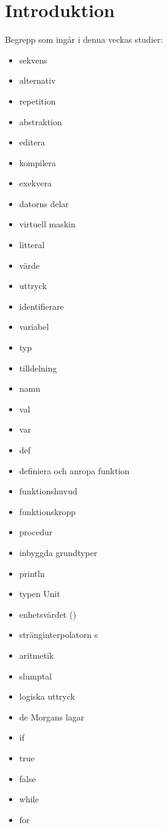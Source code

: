 \chapter{Introduktion}\label{chapter:W01}
Begrepp som ingår i denna veckas studier:
\begin{multicols}{2}\begin{itemize}[noitemsep,label={$\square$},leftmargin=*]
\item sekvens
\item alternativ
\item repetition
\item abstraktion
\item editera
\item kompilera
\item exekvera
\item datorns delar
\item virtuell maskin
\item litteral
\item värde
\item uttryck
\item identifierare
\item variabel
\item typ
\item tilldelning
\item namn
\item val
\item var
\item def
\item definiera och anropa funktion
\item funktionshuvud
\item funktionskropp
\item procedur
\item inbyggda grundtyper
\item println
\item typen Unit
\item enhetsvärdet ()
\item stränginterpolatorn s
\item aritmetik
\item slumptal
\item logiska uttryck
\item de Morgans lagar
\item if
\item true
\item false
\item while
\item for\end{itemize}\end{multicols}
